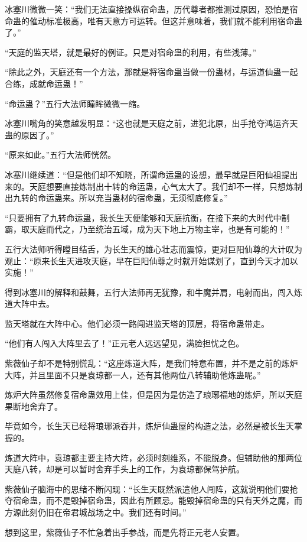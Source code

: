 \begin{this_body}
冰塞川微微一笑：“我们无法直接操纵宿命蛊，历代尊者都推测过原因，恐怕是宿命蛊的催动标准极高，唯有天意方可运转。但这并意味着，我们就不能利用宿命蛊了。”

“天庭的监天塔，就是最好的例证。只是对宿命蛊的利用，有些浅薄。”

“除此之外，天庭还有一个方法，那就是将宿命蛊当做一份蛊材，与运道仙蛊一起合练，成就命运蛊！”

“命运蛊？”五行大法师瞳眸微微一缩。

冰塞川嘴角的笑意越发明显：“这也就是天庭之前，进犯北原，出手抢夺鸿运齐天蛊的原因了。”

“原来如此。”五行大法师恍然。

冰塞川继续道：“但是他们却不知晓，所谓命运蛊的设想，最早就是巨阳仙祖提出来的。天庭想要直接炼制出十转的命运蛊，心气太大了。我们却不一样，只想炼制出九转的命运蛊来。所以充当蛊材的宿命蛊，无须彻底修复。”

“只要拥有了九转命运蛊，我长生天便能够和天庭抗衡，在接下来的大时代中制霸，取天庭而代之，乃至统治五域，成为天下地上万物主宰，也是有可能的！”

五行大法师听得瞠目结舌，为长生天的雄心壮志而震惊，更对巨阳仙尊的大计叹为观止：“原来长生天进攻天庭，早在巨阳仙尊之时就开始谋划了，直到今天才加以实施！”

得到冰塞川的解释和鼓舞，五行大法师再无犹豫，和牛魔并肩，电射而出，闯入炼道大阵中去。

监天塔就在大阵中心。他们必须一路闯进监天塔的顶层，将宿命蛊带走。

“他们有人闯入大阵里去了！”正元老人远远望见，满脸担忧之色。

紫薇仙子却不是特别慌乱：“这座炼道大阵，是我们特意布置，并不是之前的炼炉大阵，并且里面不只是袁琼都一人，还有其他两位八转辅助他炼蛊呢。”

炼炉大阵虽然修复宿命蛊效用上佳，但是因为是仿造了琅琊福地的炼炉，所以天庭果断地舍弃了。

毕竟如今，长生天已经将琅琊派吞并，炼炉仙蛊屋的构造之法，必然是被长生天掌握的。

炼道大阵中，袁琼都主要主持大阵，必须时刻维系，不能脱身。但辅助他的那两位天庭八转，却是可以暂时舍弃手头上的工作，为袁琼都保驾护航。

紫薇仙子脑海中的思绪不断闪现：“长生天既然派遣他人闯阵，这就说明他们要抢夺宿命蛊，而不是毁掉宿命蛊，因此有所顾忌。能毁掉宿命蛊的只有天外之魔，而方源此刻仍旧在帝君城战场之中。我们还有时间。”

想到这里，紫薇仙子不忙急着出手参战，而是先将正元老人安置。


\end{this_body}
